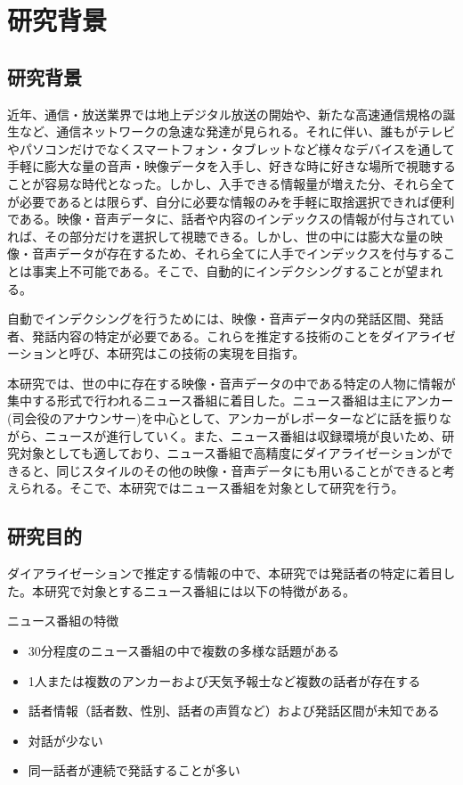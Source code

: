 \chapter{研究背景}

\section{研究背景}
近年、通信・放送業界では地上デジタル放送の開始や、新たな高速通信規格の誕生など、通信ネットワークの急速な発達が見られる。それに伴い、誰もがテレビやパソコンだけでなくスマートフォン・タブレットなど様々なデバイスを通して手軽に膨大な量の音声・映像データを入手し、好きな時に好きな場所で視聴することが容易な時代となった。しかし、入手できる情報量が増えた分、それら全てが必要であるとは限らず、自分に必要な情報のみを手軽に取捨選択できれば便利である。映像・音声データに、話者や内容のインデックスの情報が付与されていれば、その部分だけを選択して視聴できる。しかし、世の中には膨大な量の映像・音声データが存在するため、それら全てに人手でインデックスを付与することは事実上不可能である。そこで、自動的にインデクシングすることが望まれる。\par
自動でインデクシングを行うためには、映像・音声データ内の発話区間、発話者、発話内容の特定が必要である。これらを推定する技術のことをダイアライゼーションと呼び、本研究はこの技術の実現を目指す。\par
本研究では、世の中に存在する映像・音声データの中である特定の人物に情報が集中する形式で行われるニュース番組に着目した。ニュース番組は主にアンカー(司会役のアナウンサー)を中心として、アンカーがレポーターなどに話を振りながら、ニュースが進行していく。また、ニュース番組は収録環境が良いため、研究対象としても適しており、ニュース番組で高精度にダイアライゼーションができると、同じスタイルのその他の映像・音声データにも用いることができると考えられる。そこで、本研究ではニュース番組を対象として研究を行う。

\section{研究目的}
ダイアライゼーションで推定する情報の中で、本研究では発話者の特定に着目した。本研究で対象とするニュース番組には以下の特徴がある。\newline

ニュース番組の特徴
\begin{itemize}
\item 30分程度のニュース番組の中で複数の多様な話題がある
\item 1人または複数のアンカーおよび天気予報士など複数の話者が存在する
\item 話者情報（話者数、性別、話者の声質など）および発話区間が未知である
\item 対話が少ない
\item 同一話者が連続で発話することが多い
\end{itemize}\par\par

